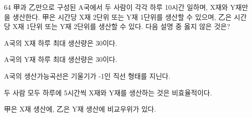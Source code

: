 \begin{question}{64}
甲과 乙만으로 구성된 A국에서 두 사람이 각각 하루 10시간 일하며, X재와 Y재만을 생산한다. 甲은 시간당 X재 2단위 또는 Y재 1단위를 생산할 수 있으며, 乙은 시간당 X재 1단위 또는 Y재 2단위를 생산할 수 있다. 다음 설명 중 옳지 않은 것은?
\begin{choices}
  \item A국의 X재 하루 최대 생산량은 30이다.
  \item A국의 Y재 하루 최대 생산량은 30이다.
  \item A국의 생산가능곡선은 기울기가 -1인 직선 형태를 지닌다.
  \item 두 사람 모두 하루에 5시간씩 X재와 Y재를 생산하는 것은 비효율적이다.
  \item 甲은 X재 생산에, 乙은 Y재 생산에 비교우위가 있다.
\end{choices}
\end{question}
